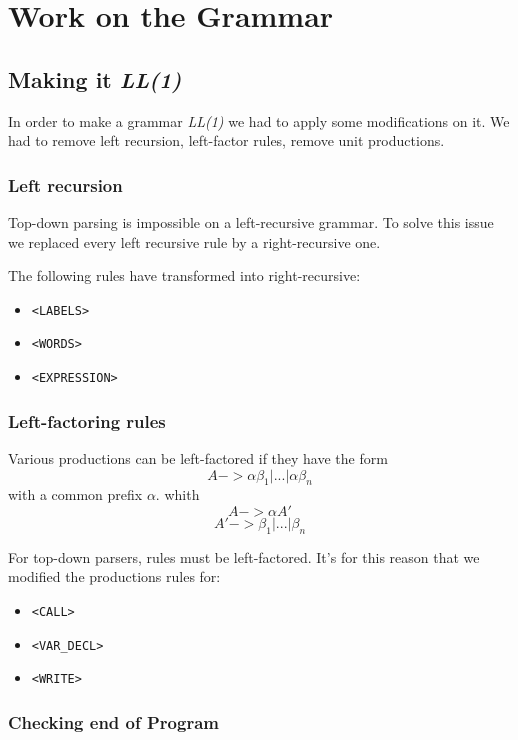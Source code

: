 \newpage\cleardoublepage{}
\section{Work on the Grammar}


\subsection{Making it \emph{LL(1)}}
In order to make a grammar \emph{LL(1)} we had to apply some modifications on it. We had to remove left recursion, left-factor rules, remove unit productions.

\subsubsection{Left recursion}

Top-down parsing is impossible on a left-recursive grammar. To solve this issue we replaced every left recursive rule by a right-recursive one.

The following rules have transformed into right-recursive:
\begin{itemize}
	\item \verb!<LABELS>!
	\item \verb!<WORDS>!
	\item \verb!<EXPRESSION>!
\end{itemize}


\subsubsection{Left-factoring rules}
Various productions can be left-factored if they have the form
$$A -> \alpha \beta_{1} | ... | \alpha\beta_{n}$$
with a common prefix $\alpha$.
whith
$$A -> \alpha A'$$
$$A' -> \beta_{1} | ... | \beta_{n}$$

For top-down parsers, rules must be left-factored.
It's for this reason that we modified the productions rules for:
\begin{itemize}
	\item \verb!<CALL>!
	\item \verb!<VAR_DECL>!
	\item \verb!<WRITE>!
\end{itemize}


\subsubsection{Checking end of Program}

